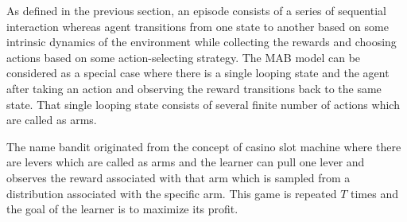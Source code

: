 As defined in the previous section, an episode consists of a series of sequential interaction whereas agent transitions from one state to another based on some intrinsic dynamics of the environment while collecting the rewards and choosing actions based on some action-selecting strategy. The MAB model can be considered as a special case where there is a single looping state and the agent after taking an action and observing the reward transitions back to the same state. That single looping state consists of several finite number of actions which are called as arms.

    The name bandit originated from the concept of casino slot machine where there are levers which are called as arms and the learner can pull one lever and observes the reward associated with that arm which is sampled from a distribution associated with the specific arm. This game is repeated $T$ times and the goal of the learner is to maximize its profit. 

